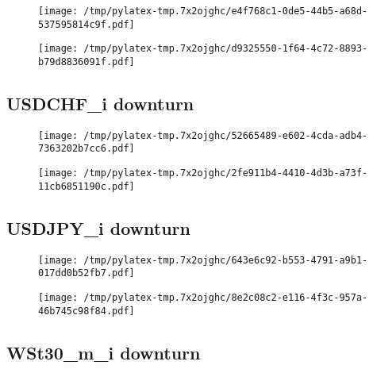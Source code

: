 \documentclass{article}%
\begin{document}
\begin{figure}[htbp]%
\centering%
\texttt{[image: /tmp/pylatex-tmp.7x2ojghc/e4f768c1-0de5-44b5-a68d-537595814c9f.pdf]}%
\end{figure}

%


\begin{figure}[htbp]%
\centering%
\texttt{[image: /tmp/pylatex-tmp.7x2ojghc/d9325550-1f64-4c72-8893-b79d8836091f.pdf]}%
\end{figure}

%
\newpage %
\subsection{USDCHF\_i downturn}%
\label{subsec:USDCHFidownturn}%


\begin{figure}[htbp]%
\centering%
\texttt{[image: /tmp/pylatex-tmp.7x2ojghc/52665489-e602-4cda-adb4-7363202b7cc6.pdf]}%
\end{figure}

%


\begin{figure}[htbp]%
\centering%
\texttt{[image: /tmp/pylatex-tmp.7x2ojghc/2fe911b4-4410-4d3b-a73f-11cb6851190c.pdf]}%
\end{figure}

%
\newpage %
\subsection{USDJPY\_i downturn}%
\label{subsec:USDJPYidownturn}%


\begin{figure}[htbp]%
\centering%
\texttt{[image: /tmp/pylatex-tmp.7x2ojghc/643e6c92-b553-4791-a9b1-017dd0b52fb7.pdf]}%
\end{figure}

%


\begin{figure}[htbp]%
\centering%
\texttt{[image: /tmp/pylatex-tmp.7x2ojghc/8e2c08c2-e116-4f3c-957a-46b745c98f84.pdf]}%
\end{figure}

%
\newpage %
\subsection{WSt30\_m\_i downturn}%
\label{subsec:WSt30midownturn}%
\end{document}
